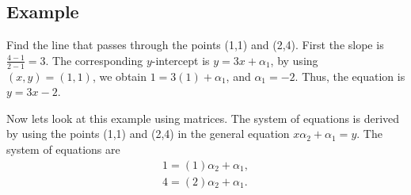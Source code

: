 \documentclass[12pt]{amsart}
\begin{document}
 
 
 
\subsection{Example}
Find the line that passes through the points (1,1) and (2,4).
First the slope is $\frac{4-1}{2-1}=3$. The corresponding $y$-intercept is $y=3x+\alpha_1$, by using $(x,y)=(1,1)$, we obtain $1=3(1)+\alpha_1$, and $\alpha_1=-2$. Thus, the equation is $y=3x-2$.
 
Now lets look at this example using matrices.
The system of equations is derived by using the points (1,1) and (2,4) in the general equation $x\alpha_2+\alpha_1=y$.
The system of equations are
\begin{equation*}
\begin{array}{l}
1=(1)\alpha_2+\alpha_1,\\
4=(2)\alpha_2+\alpha_1.
\end{array}
\end{equation*}
 
\end{document}
